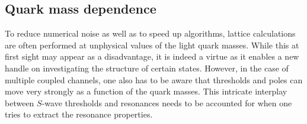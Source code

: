 \subsection{Quark mass dependence}
\label{sec:qmdep}


To reduce numerical noise as well as to speed up algorithms, 
lattice {calculations}
are often performed at unphysical values of the light quark masses. 
While this at first sight may appear as a disadvantage, it is indeed
a virtue as it enables a new handle on investigating the structure
of certain states. However, in the case of multiple coupled channels,
one also has to be aware that thresholds and poles can move very
strongly as a function of the quark masses. This intricate interplay
between $S$-wave thresholds and resonances needs to be accounted for 
when one tries to extract the resonance properties.


